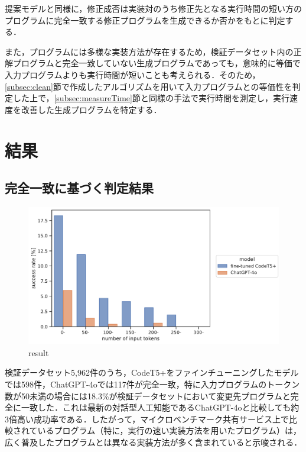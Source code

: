 \documentclass[submit,techrep,noauthor]{ipsj}
\begin{document}
提案モデルと同様に，修正成否は実装対のうち修正先となる実行時間の短い方のプログラムに完全一致する修正プログラムを生成できるか否かをもとに判定する．

また，プログラムには多様な実装方法が存在するため，検証データセット内の正解プログラムと完全一致していない生成プログラムであっても，意味的に等価で入力プログラムよりも実行時間が短いことも考えられる．そのため，\ref{subsec:clean}節で作成したアルゴリズムを用いて入力プログラムとの等価性を判定した上で，\ref{subsec:measureTime}節と同様の手法で実行時間を測定し，実行速度を改善した生成プログラムを特定する．



\section{結果}\label{sec:result}

\subsection{完全一致に基づく判定結果}

\begin{figure}[t]
\begin{center}
\includegraphics[width=1.0\linewidth]{Omori_fig/result.pdf}
\caption{result}
\label{fig-result}
\end{center}
\end{figure}


検証データセット5,962件のうち，CodeT5+をファインチューニングしたモデルでは598件，ChatGPT-4oでは117件が完全一致，特に入力プログラムのトークン数が50未満の場合には18.3\%が検証データセットにおいて変更先プログラムと完全に一致した．これは最新の対話型人工知能であるChatGPT-4oと比較しても約3倍高い成功率である．したがって，マイクロベンチマーク共有サービス上で比較されているプログラム（特に，実行の速い実装方法を用いたプログラム）は，広く普及したプログラムとは異なる実装方法が多く含まれていると示唆される．
\end{document}
